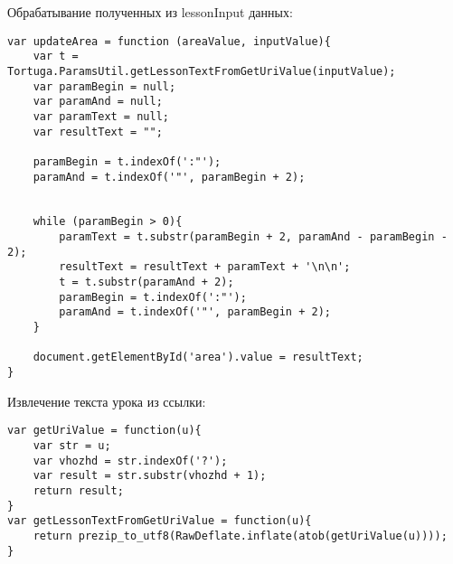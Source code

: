 Обрабатывание полученных из lessonInput  данных:
\begin{verbatim}
var updateArea = function (areaValue, inputValue){
    var t =  Tortuga.ParamsUtil.getLessonTextFromGetUriValue(inputValue);
    var paramBegin = null;
    var paramAnd = null;
    var paramText = null;
    var resultText = "";

    paramBegin = t.indexOf(':"');
    paramAnd = t.indexOf('"', paramBegin + 2);

	
    while (paramBegin > 0){
        paramText = t.substr(paramBegin + 2, paramAnd - paramBegin - 2);
        resultText = resultText + paramText + '\n\n';
        t = t.substr(paramAnd + 2);
        paramBegin = t.indexOf(':"');
        paramAnd = t.indexOf('"', paramBegin + 2);
    }

    document.getElementById('area').value = resultText;
}
\end{verbatim}

Извлечение текста урока из ссылки:

\begin{verbatim}
var getUriValue = function(u){
    var str = u;
    var vhozhd = str.indexOf('?');
    var result = str.substr(vhozhd + 1);
    return result;
}
var getLessonTextFromGetUriValue = function(u){
    return prezip_to_utf8(RawDeflate.inflate(atob(getUriValue(u))));
}
\end{verbatim}


